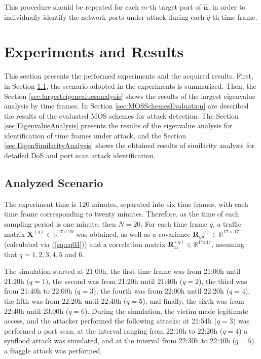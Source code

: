 \documentclass{bmcart}
\begin{document}
This procedure should be repeated for each $m$-th target port of $\boldsymbol{\hat{n}}$, in order to individually identify the network ports under attack during each $\hat{q}$-th time frame.

\section{Experiments and Results}
\label{sec:experimentalresults}

This section presents the performed experiments and the acquired results. First, in Section \ref{sec:AnalyzedScenario}, the scenario adopted in the experiments is summarized. Then, the Section \ref{sec:largesteigenvaluesanalysis} shows the results of the largest eigenvalue analysis by time frames. In Section \ref{sec:MOSSchemesEvaluation} are described the results of the evaluated MOS schemes for attack detection. The Section \ref{sec:EigenvalueAnalysis} presents the results of the eigenvalue analysis for identification of time frames under attack, and the Section \ref{sec:EigenSimilarityAnalysis} shows the obtained results of similarity analysis for detailed DoS and port scan attack identification.

\subsection{Analyzed Scenario}
\label{sec:AnalyzedScenario}

The experiment time is 120 minutes, separated into six time frames, with each time frame corresponding to twenty minutes. Therefore, as the time of each sampling period is one minute, then $N = 20$. For each time frame $q$, a traffic matrix $\boldsymbol{X}^{(q)} \in \mathbb{R}^{17 \times 20}$ was obtained, as well as a covariance $\boldsymbol{R}_{yy}^{(q)} \in \mathbb{R}^{17 \times 17}$ (calculated via (\ref{eq:eq03})) and a correlation matrix $\boldsymbol{R}_{zz}^{(q)} \in \mathbb{R}^{17x17}$, assuming that $q = 1, 2, 3, 4, 5$ and $6$. 

The simulation started at 21:00h, the first time frame was from 21:00h until 21:20h ($q = 1$), the second was from 21:20h until 21:40h ($q = 2$), the third was from 21:40h to 22:00h ($q = 3$), the fourth was from 22:00h until 22:20h ($q = 4$), the fifth was from 22:20h until 22:40h ($q = 5$), and finally, the sixth was from 22:40h until 23.00h ($q = 6$). During the simulation, the victim made legitimate access, and the attacker performed the following attacks: at 21:54h ($q = 3$) was performed a port scan, at the interval ranging from 22:10h to 22:20h ($q = 4$) a synflood attack was simulated, and at the interval from 22:30h to 22:40h ($q = 5$) a fraggle attack was performed.
\end{document}
